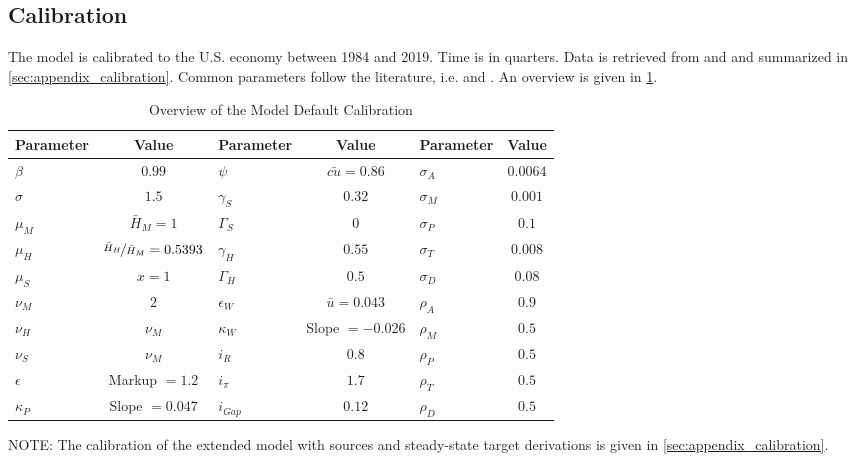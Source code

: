 \documentclass[12pt,3p,authoryear,review]{elsarticle}
\begin{document}
\subsection{Calibration}\label{sec:calibration}%
The model is calibrated to the U.S. economy between 1984 and 2019. Time is in quarters. Data is retrieved from \cite{fredDATA} and \cite{atusDATA} and summarized in \ref{sec:appendix_calibration}. Common parameters follow the literature, i.e. \cite{christianoDSGEModelsMonetary2010} and \cite{gnocchiHouseworkFiscalExpansions2016}. An overview is given in \cref{tab:calibration}.\\%
\begin{table}%
	\begin{center}%
	\begin{footnotesize}%
	\caption{Overview of the Model Default Calibration}\label{tab:calibration}%
	\begin{tabular}{l c@{\hskip 18pt} l c @{\hskip 18pt} l c}%
		\hline%
		Parameter & Value & Parameter & Value & Parameter & Value\\%
		\hline \hline%
		$\beta$ & $0.99$ & $\psi$ & $\bar{cu}=0.86$ & $\sigma_A$ & $0.0064$\\%
		$\sigma$ & $1.5$ & $\gamma_S$ & $0.32$ & $\sigma_M$ & $0.001$\\%
		$\mu_M$ & $\bar{H}_M = 1$ & $\Gamma_S$ & $0$ & $\sigma_P$ & $0.1$\\%
		$\mu_H$ & $\nicefrac{\bar{H}_H}{\bar{H}_M} = 0.5393$ & $\gamma_H$ & $0.55$ & $\sigma_T$ & $0.008$\\%
		$\mu_S$ & $x = 1$ & $\Gamma_H$ & $0.5$ & $\sigma_D$ & $0.08$\\%
		$\nu_M$ & $2$ & $\epsilon_W$ & $\bar{u}=0.043$ & $\rho_A$ & $0.9$\\%
		$\nu_H$ & $\nu_M$ & $\kappa_W$ & Slope $= -0.026$ & $\rho_M$ & $0.5$\\%
		$\nu_S$ & $\nu_M$ & $i_R$ & $0.8$ & $\rho_P$ & $0.5$\\%
		$\epsilon$ & Markup $= 1.2$ & $i_\pi$ & $1.7$ & $\rho_T$ & $0.5$\\%
		$\kappa_P$ & Slope $= 0.047$ & $i_{Gap}$ & $0.12$ & $\rho_D$ & $0.5$\\%
		\hline%
	\end{tabular}%
	{\tiny \singlespacing NOTE: The calibration of the extended model with sources and steady-state target derivations is given in \ref{sec:appendix_calibration}.\par}%
	\end{footnotesize}%
	\end{center}%
\end{table}%
\end{document}
